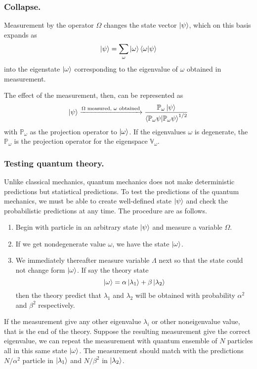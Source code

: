 \documentclass[../../../main.tex]{subfiles}
\begin{document}
\subsubsection{Collapse.}
Measurement by the operator $\Omega$ changes the state vector $\ket{\psi}$, which on this basis expands as 
\begin{equation*}
    \ket{\psi}=\sum_\omega \ket{\omega}\braket{\omega|\psi}
\end{equation*}
into the eigenstate $\ket{\omega}$ corresponding to the eigenvalue of $\omega$  obtained in measurement.

The effect of the measurement, then, can be represented as 
\begin{equation*}
    \ket{\psi}\xrightarrow{\Omega\text{ measured, }\omega\text{ obtained}}\frac{\mathbb{P}_\omega \ket{\psi }}{\braket{\mathbb{P}_\omega\psi|\mathbb{P }_\omega \psi}^{1/2}}
\end{equation*}
with $\mathbb{P }_\omega$ as the projection operator to $\ket{\omega}$. 
If the eigenvalues $\omega$ is degenerate, the $\mathbb{P }_\omega$ is the projection operator for the eigenspace $\mathbb{V}_\omega$. 

\subsubsection{Testing quantum theory.}
Unlike classical mechanics, quantum mechanics does not make deterministic predictions but statistical predictions.
To test the predictions of the quantum mechanics, we must be able to create well-defined state $\ket{\psi}$ and check the probabilistic predictions at any time.
The procedure are as follows.
\begin{enumerate}
    \item Begin with particle in an arbitrary state $\ket{\psi}$ and measure a variable $\Omega$.
    \item If we get nondegenerate value $\omega$, we have the state $\ket{\omega}$.
    \item We immediately thereafter measure variable $\Lambda$ next so that the state could not change form $\ket{\omega}$.
    If say the theory state 
    \begin{equation*}
        \ket{\omega}=\alpha \ket{\lambda_1}+\beta \ket{\lambda_2}
    \end{equation*}
    then the theory predict that $\lambda_1$ and $\lambda_2$ will be obtained with probability $\alpha^2$ and $\beta^2$ respectively.
\end{enumerate}
If the measurement give any other eigenvalue $\lambda_i$ or other noneigenvalue value, that is the end of the theory.
Suppose the resulting measurement give the correct eigenvalue, we can repeat the measurement with quantum ensemble of $N$ particles all in this same state $\ket{\omega}$.
The measurement should match with the predictions $N/\alpha^2$ particle in $\ket{\lambda_1}$ and $N/\beta^2$ in $\ket{\lambda_2}$.
\end{document}
